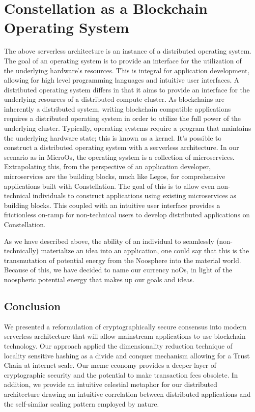 \documentclass{article}
\begin{document}
\section{Constellation as a Blockchain Operating System}
The above serverless architecture is an instance of a distributed operating system. The goal of an operating system is to provide an interface for the utilization of the underlying hardware's resources. This is integral for application development, allowing for high level programming languages and intuitive user interfaces. A distributed operating system differs in that it aims to provide an interface for the underlying resources of a distributed compute cluster. As blockchains are inherently a distributed system, writing blockchain compatible applications requires a distributed operating system in order to utilize the full power of the underlying cluster. Typically, operating systems require a program that maintains the underlying hardware state; this is known as a kernel. It's possible to construct a distributed operating system with a serverless architecture. In our scenario as in MicroOs, the operating system is a collection of microservices. Extrapolating this, from the perspective of an application developer, microservices are the building blocks, much like Legos, for comprehensive applications built with Constellation. The goal of this is to allow even non-technical individuals to construct applications using existing microservices as building blocks. This coupled with an intuitive user interface provides a frictionless on-ramp for non-technical users to develop distributed applications on Constellation.

As we have described above, the ability of an individual to seamlessly (non-technically) materialize an idea into an application, one could say that this is the  transmutation of potential energy from the Noosphere into the material world. Because of this, we have decided to name our currency noOs, in light of the noospheric potential energy that makes up our goals and ideas.

\subsection{Conclusion}
We presented a reformulation of cryptographically secure consensus into modern serverless architecture that will allow mainstream applications to use blockchain technology. Our approach applied the dimensionality reduction technique of locality sensitive hashing as a divide and conquer mechanism allowing for a Trust Chain at internet scale. Our meme economy provides a deeper layer of cryptographic security and the potential to make transaction fees obsolete. In addition, we provide an intuitive celestial metaphor for our distributed architecture drawing an intuitive correlation between distributed applications and the self-similar scaling pattern employed by nature.


\end{document}
